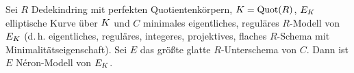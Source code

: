 \documentclass[german]{scrreprt}
\begin{document}
\begin{Satz}\label{thm:exneronmodelle}

  Sei $R$ Dedekindring mit perfekten Quotientenkörpern,
  $K=\operatorname{Quot}(R)$, $E_{K}$ elliptische Kurve über $K$ und $C$ minimales
  eigentliches, reguläres $R$-Modell von $E_{K}$
  (d.\,h. eigentliches, reguläres, integeres, projektives,
  flaches $R$-Schema mit Minimalitätseigenschaft).
  Sei $E$ das größte glatte $R$-Unterschema von $C$.
  Dann ist $E$ Néron-Modell von $E_{K}$.


\end{Satz}
\end{document}
